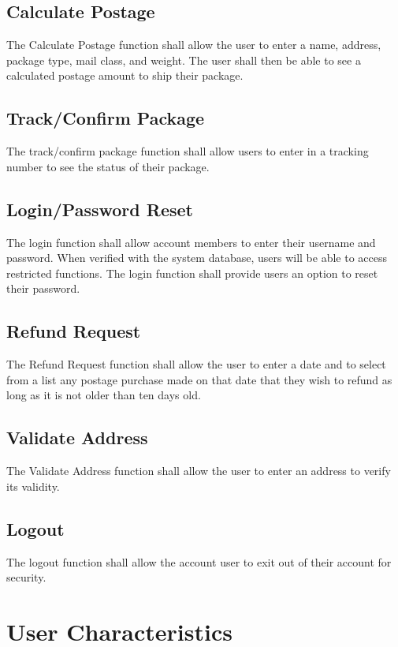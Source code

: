 \documentclass{scrreprt}
\begin{document}
\subsection{Calculate Postage}

The Calculate Postage function shall allow the user to enter a name, address,
package type, mail class, and weight. The user shall then be able to see a
calculated postage amount to ship their package.

\subsection{Track/Confirm Package}

The track/confirm package function shall allow users to enter in a tracking
number to see the status of their package.

\subsection{Login/Password Reset}

The login function shall allow account members to enter their username and
password.  When verified with the system database, users will be able to access
restricted functions. The login function shall provide users an option to
reset their password. 

\subsection{Refund Request}

The Refund Request function shall allow the user to enter a date and to select
from a list any postage purchase made on that date that they wish to refund as
long as it is not older than ten days old.

\subsection{Validate Address}

The Validate Address function shall allow the user to enter an address to
verify its validity.

\subsection{Logout}

The logout function shall allow the account user to exit out of their account
for security.

\section{User Characteristics}
\end{document}
